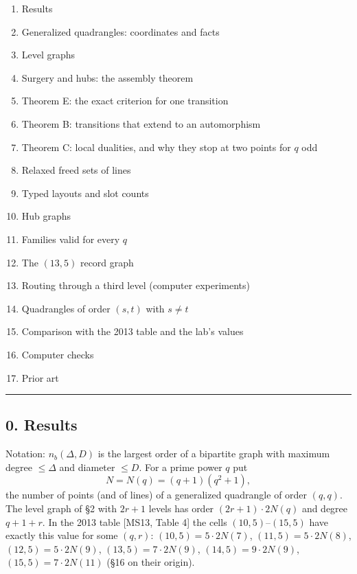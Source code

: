\documentclass[
  11pt,
]{article}
\providecommand{\tightlist}{%
  \setlength{\itemsep}{0pt}\setlength{\parskip}{0pt}}
\begin{document}
\begin{enumerate}
\def\labelenumi{\arabic{enumi}.}
\setcounter{enumi}{-1}
\tightlist
\item
  Results
\item
  Generalized quadrangles: coordinates and facts
\item
  Level graphs
\item
  Surgery and hubs: the assembly theorem
\item
  Theorem E: the exact criterion for one transition
\item
  Theorem B: transitions that extend to an automorphism
\item
  Theorem C: local dualities, and why they stop at two points for \(q\)
  odd
\item
  Relaxed freed sets of lines
\item
  Typed layouts and slot counts
\item
  Hub graphs
\item
  Families valid for every \(q\)
\item
  The \((13,5)\) record graph
\item
  Routing through a third level (computer experiments)
\item
  Quadrangles of order \((s,t)\) with \(s\ne t\)
\item
  Comparison with the 2013 table and the lab's values
\item
  Computer checks
\item
  Prior art
\end{enumerate}

\begin{center}\rule{0.5\linewidth}{0.5pt}\end{center}

\hypertarget{results}{%
\subsection{0. Results}\label{results}}

Notation: \(n_b(\Delta,D)\) is the largest order of a bipartite graph
with maximum degree \(\le\Delta\) and diameter \(\le D\). For a prime
power \(q\) put \[N = N(q) = (q+1)(q^2+1),\] the number of points (and
of lines) of a generalized quadrangle of order \((q,q)\). The level
graph of §2 with \(2r+1\) levels has order \((2r+1)\cdot 2N(q)\) and
degree \(q+1+r\). In the 2013 table {[}MS13, Table 4{]} the cells
\((10,5)\)--\((15,5)\) have exactly this value for some \((q,r)\):
\((10,5) = 5\cdot 2N(7)\), \((11,5) = 5\cdot 2N(8)\),
\((12,5) = 5\cdot 2N(9)\), \((13,5) = 7\cdot 2N(9)\),
\((14,5) = 9\cdot 2N(9)\), \((15,5) = 7\cdot 2N(11)\) (§16 on their
origin).
\end{document}
